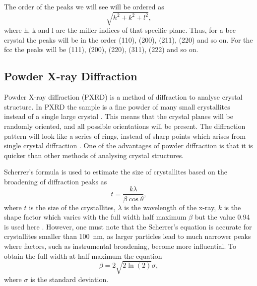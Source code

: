 The order of the peaks we will see will be ordered as 
\begin{equation}
    \sqrt{h^2+k^2+l^2},
    \label{eq:ordering}
\end{equation}  
where h, k and l are the miller indices of that specific plane. Thus, for a bcc crystal the peaks will be in the order (110), (200), (211), (220) and so on. For the fcc the peaks will be (111), (200), (220), (311), (222) and so on.  

\subsection{Powder X-ray Diffraction}
Powder X-ray diffraction (PXRD) is a method of diffraction to analyse crystal structure. In PXRD the sample is a fine powder of many small crystallites instead of a single large crystal \cite{hofmann2015}. This means that the crystal planes will be randomly oriented, and all possible orientations will be present. The diffraction pattern will look like a series of rings, instead of sharp points which arises from single crystal diffraction \cite{hofmann2015}. One of the advantages of powder diffraction is that it is quicker than other methods of analysing crystal structures.

Scherrer's formula is used to estimate the size of crystallites based on the broadening of diffraction peaks as 
\begin{equation}
    t=\frac{k\lambda}{\beta\cos\theta},
    \label{eq:Scherre}
\end{equation}
where $t$ is the size of the crystallites, $\lambda$ is the wavelength of the x-ray, $k$ is the shape factor which varies with the full width half maximum $\beta$ but the value 0.94 is used here \cite{solidstatephysics2025}. However, one must note that the Scherrer's equation is accurate for crystallites smaller than \SI[scientific-notation=false]{100}{\nano\m}, as larger particles lead to much narrower peaks where factors, such as instrumental broadening, become more influential. To obtain the full width at half maximum the equation 
\begin{equation}
    \beta =2\sqrt{2 \ln(2)}\sigma,
    \label{eq:FWHM}
\end{equation}
where $\sigma$ is the standard deviation. 
